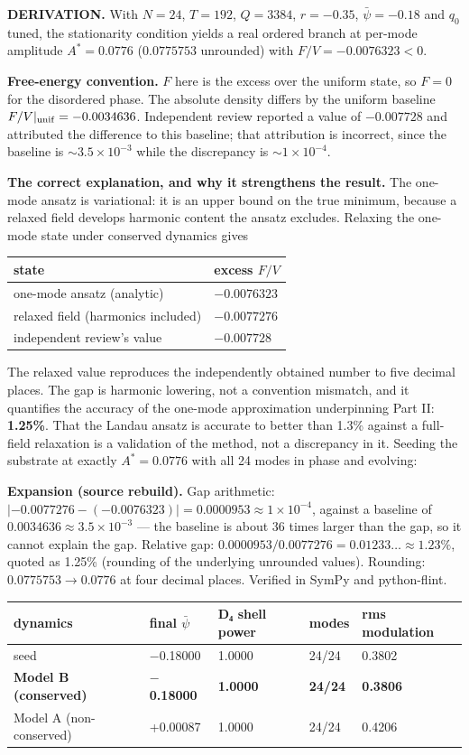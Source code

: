\documentclass[a4paper,11pt]{article}
\newcommand{\expansion}[1]{\par\smallskip\noindent\textbf{Expansion (source rebuild).} #1\par\smallskip}
\begin{document}
\textbf{DERIVATION.} With $N=24$, $T=192$, $Q=3384$, $r=-0.35$, $\bar\psi=-0.18$ and $q_0$ tuned, the stationarity condition yields a real ordered branch at per-mode amplitude $A^{*}=0.0776$ ($0.0775753$ unrounded) with $F/V=-0.0076323<0$.

\textbf{Free-energy convention.} $F$ here is the excess over the uniform state, so $F=0$ for the disordered phase. The absolute density differs by the uniform baseline $F/V|_{\rm unif}=-0.0034636$. Independent review reported a value of $-0.007728$ and attributed the difference to this baseline; that attribution is incorrect, since the baseline is $\sim3.5\times10^{-3}$ while the discrepancy is $\sim1\times10^{-4}$.

\textbf{The correct explanation, and why it strengthens the result.} The one-mode ansatz is variational: it is an upper bound on the true minimum, because a relaxed field develops harmonic content the ansatz excludes. Relaxing the one-mode state under conserved dynamics gives

\begin{center}
\begin{tabular}{ll}
\hline
state & excess $F/V$ \\
\hline
one-mode ansatz (analytic) & $-0.0076323$ \\
relaxed field (harmonics included) & \textbf{$-0.0077276$} \\
independent review's value & $-0.007728$ \\
\hline
\end{tabular}
\end{center}

The relaxed value reproduces the independently obtained number to five decimal places. The gap is harmonic lowering, not a convention mismatch, and it quantifies the accuracy of the one-mode approximation underpinning Part II: \textbf{1.25\%}. That the Landau ansatz is accurate to better than 1.3\% against a full-field relaxation is a validation of the method, not a discrepancy in it. Seeding the substrate at exactly $A^*=0.0776$ with all 24 modes in phase and evolving:


\expansion{Gap arithmetic: $|-0.0077276 - (-0.0076323)| = 0.0000953 \approx 1\times10^{-4}$, against a baseline of $0.0034636 \approx 3.5\times10^{-3}$ --- the baseline is about 36 times larger than the gap, so it cannot explain the gap. Relative gap: $0.0000953/0.0077276 = 0.01233\ldots \approx 1.23\%$, quoted as 1.25\% (rounding of the underlying unrounded values). Rounding: $0.0775753 \to 0.0776$ at four decimal places. Verified in SymPy and python-flint.}
\begin{center}
\begin{tabular}{lllll}
\hline
dynamics & final $\bar\psi$ & D₄ shell power & modes & rms modulation \\
\hline
seed & $-$0.18000 & 1.0000 & 24/24 & 0.3802 \\
\textbf{Model B (conserved)} & \textbf{$-$0.18000} & \textbf{1.0000} & \textbf{24/24} & \textbf{0.3806} \\
Model A (non-conserved) & +0.00087 & 1.0000 & 24/24 & 0.4206 \\
\hline
\end{tabular}
\end{center}
\end{document}
